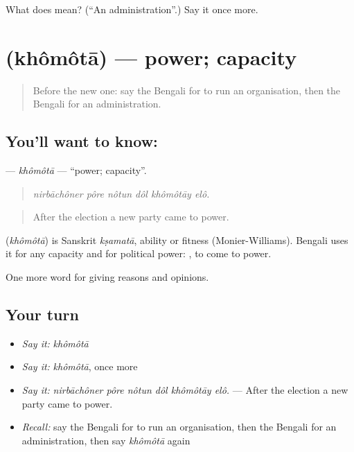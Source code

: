 \begin{tcolorbox}[breakable,colback=teal!4,colframe=teal!35!black,title={Before you move on}]
What does  mean? (\textquotedblleft{}An administration\textquotedblright{}.) Say it once more.
\end{tcolorbox}
\section[\texorpdfstring{\bn{ক্ষমতা} (khômôtā)}{ক্ষমতা (khômôtā)}]{ (khômôtā) — power; capacity}

\label{lesson:BN-C344-khomota}



\begin{quote}
Before the new one: say the Bengali for to run an organisation, then the Bengali for an administration.
\end{quote}

\subsection*{You'll want to know: }
\textbf{} — \emph{khômôtā} — \textquotedblleft{}power; capacity\textquotedblright{}.

\begin{quote}
     
\end{quote}

\begin{quote}
\emph{nirbāchôner pôre nôtun dôl khômôtāy elô.}
\end{quote}

\begin{quote}
After the election a new party came to power.
\end{quote}

\begin{cousinweb}
\textbf{} (\emph{khômôtā}) is Sanskrit \emph{kṣamatā}, ability or fitness (Monier-Williams). Bengali uses it for any capacity and for political power:  , to come to power.
\end{cousinweb}

\begin{grammarlens}[title={What you've built}]
One more word for giving reasons and opinions.
\end{grammarlens}

\subsection*{Your turn}
\begin{itemize}
\raggedright
  \item \emph{Say it:} \emph{khômôtā}
  \item \emph{Say it:} \emph{khômôtā}, once more
  \item \emph{Say it:} \emph{nirbāchôner pôre nôtun dôl khômôtāy elô.} — After the election a new party came to power.
  \item \emph{Recall:} say the Bengali for to run an organisation, then the Bengali for an administration, then say \emph{khômôtā} again
\end{itemize}


